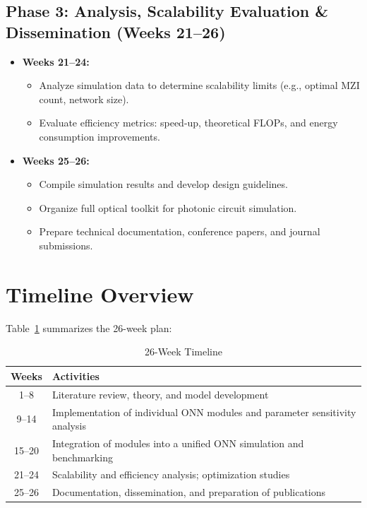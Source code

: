 \documentclass[conference]{IEEEtran}
\begin{document}
\subsection{Phase 3: Analysis, Scalability Evaluation \& Dissemination (Weeks 21--26)}
\begin{itemize}
    \item \textbf{Weeks 21--24:}
    \begin{itemize}
        \item Analyze simulation data to determine scalability limits (e.g., optimal MZI count, network size).
        \item Evaluate efficiency metrics: speed-up, theoretical FLOPs, and energy consumption improvements.
    \end{itemize}
    \item \textbf{Weeks 25--26:}
    \begin{itemize}
        \item Compile simulation results and develop design guidelines.
        \item Organize full optical toolkit for photonic circuit simulation.
        \item Prepare technical documentation, conference papers, and journal submissions.
    \end{itemize}
\end{itemize}

\section{Timeline Overview}
Table~\ref{table:timeline} summarizes the 26-week plan:

\begin{table}[h]
\centering
\caption{26-Week Timeline}
\label{table:timeline}
\begin{tabular}{|c|p{5.5cm}|}
\hline
\textbf{Weeks} & \textbf{Activities} \\
\hline
1--8 & Literature review, theory, and model development \\
\hline
9--14 & Implementation of individual ONN modules and parameter sensitivity analysis \\
\hline
15--20 & Integration of modules into a unified ONN simulation and benchmarking \\
\hline
21--24 & Scalability and efficiency analysis; optimization studies \\
\hline
25--26 & Documentation, dissemination, and preparation of publications \\
\hline
\end{tabular}
\end{table}
\end{document}
